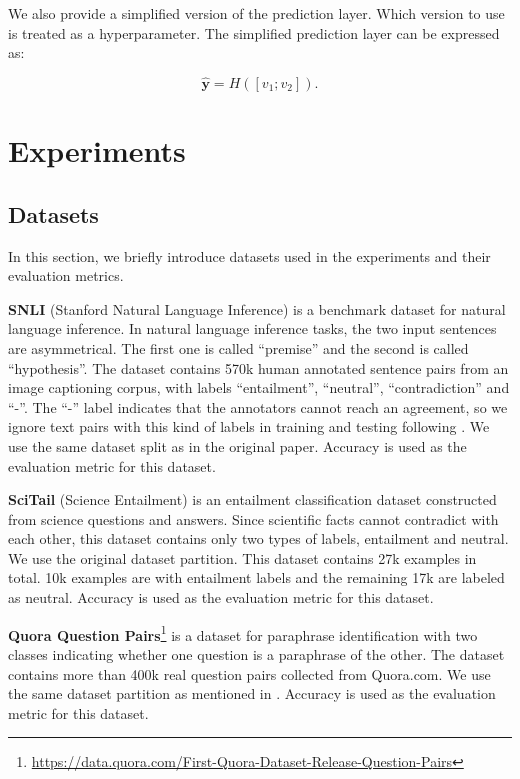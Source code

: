 \documentclass[11pt,a4paper]{article}
\begin{document}
We also provide a simplified version of the prediction layer. Which version to use is treated as a hyperparameter. The simplified prediction layer can be expressed as:

\begin{equation}
  \hat {\mathbf y} = H([v_1; v_2]). 
  \label{eq:simplified_pred}
\end{equation}

\section{Experiments}
\subsection{Datasets}
In this section, we briefly introduce datasets used in the experiments and their evaluation metrics.

{\bf SNLI} \cite{snli} (Stanford Natural Language Inference) is a benchmark dataset for natural language inference. In natural language inference tasks, the two input sentences are asymmetrical. The first one is called ``premise'' and the second is called ``hypothesis''. The dataset contains 570k human annotated sentence pairs from an image captioning corpus, with labels ``entailment'', ``neutral'', ``contradiction'' and ``-''. The ``-'' label indicates that the annotators cannot reach an agreement, so we ignore text pairs with this kind of labels in training and testing following \citeauthor{snli} . We use the same dataset split as in the original paper. Accuracy is used as the evaluation metric for this dataset.

{\bf SciTail} \cite{scitail} (Science Entailment) is an entailment classification dataset constructed from science questions and answers. Since scientific facts cannot contradict with each other, this dataset contains only two types of labels, entailment and neutral. We use the original dataset partition. This dataset contains 27k examples in total. 10k examples are with entailment labels and the remaining 17k are labeled as neutral. Accuracy is used as the evaluation metric for this dataset.

{\bf Quora Question Pairs}\footnote{\url{https://data.quora.com/First-Quora-Dataset-Release-Question-Pairs}} 
is a dataset for paraphrase identification with two classes indicating whether one question is a paraphrase of the other. The dataset contains more than 400k real question pairs collected from Quora.com. We use the same dataset partition as mentioned in \citeauthor{wang2017bilateral} . Accuracy is used as the evaluation metric for this dataset.
\end{document}
